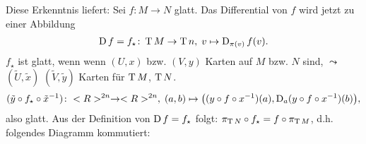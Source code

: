 Diese Erkenntnis liefert: Sei $f\colon M\to N$ glatt. Das Differential von $f$ wird jetzt zu einer Abbildung \begin{align*}
	\operatorname{D} f = f_\star\colon \operatorname{T} M\to \operatorname{T} n,\;v\mapsto \operatorname{D}_{\pi(v)} f(v).
\end{align*}
$f_\star$ ist glatt, wenn wenn $(U,x)$ bzw. $(V,y)$ Karten auf $M$ bzw. $N$ sind, $\leadsto$ $(\tilde U,\tilde x)$ $(\tilde V,\tilde y)$ Karten für $\operatorname{T} M$, $\operatorname{T} N$.\begin{align*}
	(\tilde y\circ f_\star \circ \tilde x^{-1})\colon <R>^{2n}\to <R>^{2n},\;(a,b)\mapsto \big( (y\circ f\circ x^{-1})(a),\operatorname{D}_a (y\circ f\circ x^{-1})(b)\big),
\end{align*}
also glatt. Aus der Definition von $\operatorname{D} f = f_\star$ folgt: $\pi_{\operatorname{T} N}\circ f_\star = f\circ\pi_{\operatorname{T} M}$, d.h. folgendes Diagramm kommutiert:\begin{center}
\end{center}